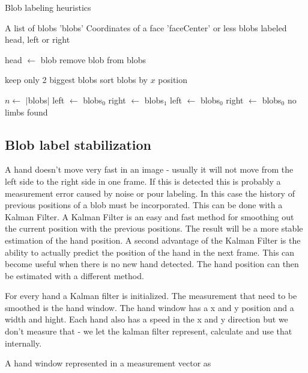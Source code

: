 \begin{algorithm}
\caption{Blob labeling heuristics}
\label{alg:blobheuristics}
\begin{algorithmic}
   \REQUIRE A list of blobs 'blobs'
   \REQUIRE Coordinates of a face 'faceCenter'
    or less blobs labeled head, left or right

			\STATE head $\leftarrow$ blob
			\STATE remove blob from blobs
		\ENDIF
	\ENDFOR

	\STATE keep only 2 biggest blobs
	\STATE sort blobs by $x$ position

	\STATE $n \leftarrow $ $|$blobs$|$
	    \STATE left $\leftarrow$ blobs$_0$
	    \STATE right $\leftarrow$ blobs$_1$
	\ELSE
		        \STATE left $\leftarrow$ blobs$_0$
		    \ELSE
		        \STATE right $\leftarrow$ blobs$_0$
			\ENDIF
		\ENDIF
	\ELSE
	    \STATE no limbs found
	\ENDIF
\end{algorithmic}
\end{algorithm}



\subsection*{Blob label stabilization}
A hand doesn't move very fast in an image - usually it will not move from the left side to the right side in one frame. If this is detected this is probably a measurement error caused by noise or pour labeling. In this case the history of previous positions of a blob must be incorporated. This can be done with a Kalman Filter. A Kalman Filter is an easy and fast method for smoothing out the current position with the previous positions. The result will be a more stable estimation of the hand position. A second advantage of the Kalman Filter is the ability to actually predict the position of the hand in the next frame. This can become useful when there is no new hand detected. The hand position can then be estimated with a different method.

For every hand a Kalman filter is initialized. The measurement that need to be smoothed is the hand window. The hand window has a x and y position and a width and hight. Each hand also has a speed in the x and y direction but we don't measure that - we let the kalman filter represent, calculate and use that internally. 

A hand window represented in a measurement vector as

